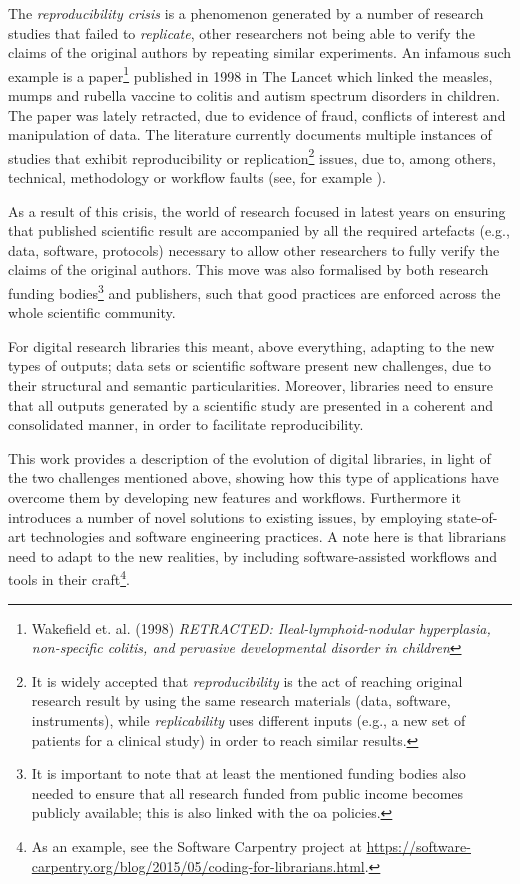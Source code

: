 The \emph{reproducibility crisis} is a phenomenon generated by a number of research studies that failed to \emph{replicate}, other researchers not being able to verify the claims of the original authors by repeating similar experiments. An infamous such example is a paper\footnote{Wakefield et. al. (1998) \emph{RETRACTED: Ileal-lymphoid-nodular hyperplasia, non-specific colitis, and pervasive developmental disorder in children}} published in 1998 in The Lancet which linked the measles, mumps and rubella vaccine to colitis and autism spectrum disorders in children. The paper was lately retracted, due to evidence of fraud, conflicts of interest and manipulation of data. The literature currently documents multiple instances of studies that exhibit reproducibility or replication\footnote{It is widely accepted that \emph{reproducibility} is the act of reaching original research result by using the same research materials (data, software, instruments), while \emph{replicability} uses different inputs (e.g., a new set of patients for a clinical study) in order to reach similar results\cite{patil}.} issues, due to, among others, technical, methodology or workflow faults (see, for example \cite{eklund,seekblastn}).

As a result of this crisis, the world of research focused in latest years on ensuring that published scientific result are accompanied by all the required artefacts (e.g., data, software, protocols) necessary to allow other researchers to fully verify the claims of the original authors. This move was also formalised by both research funding bodies\cite{h2020,nih}\footnote{It is important to note that at least the mentioned funding bodies also needed to ensure that all research funded from public income becomes publicly available; this is also linked with the \gls{oa} policies.} and publishers\cite{scidat,elsdat}, such that good practices are enforced across the whole scientific community.

For digital research libraries this meant, above everything, adapting to the new types of outputs; data sets or scientific software present new challenges, due to their structural and semantic particularities. Moreover, libraries need to ensure that all outputs generated by a scientific study are presented in a coherent and consolidated manner, in order to facilitate reproducibility.

This work provides a description of the evolution of digital libraries, in light of the two challenges mentioned above, showing how this type of applications have overcome them by developing new features and workflows. Furthermore it introduces a number of novel solutions to existing issues, by employing state-of-art technologies and software engineering practices. A note here is that librarians need to adapt to the new realities, by including software-assisted workflows and tools in their craft\footnote{As an example, see the Software Carpentry project at \url{https://software-carpentry.org/blog/2015/05/coding-for-librarians.html}.}.

